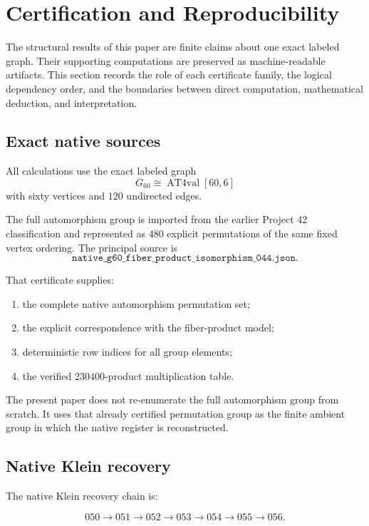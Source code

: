 \section{Certification and Reproducibility}

The structural results of this paper are finite claims about one exact
labeled graph. Their supporting computations are preserved as
machine-readable artifacts. This section records the role of each
certificate family, the logical dependency order, and the boundaries
between direct computation, mathematical deduction, and interpretation.

\subsection{Exact native sources}

All calculations use the exact labeled graph
\[
G_{60}\cong\operatorname{AT4val}[60,6]
\]
with sixty vertices and \(120\) undirected edges.

The full automorphism group is imported from the earlier Project 42
classification and represented as \(480\) explicit permutations of the
same fixed vertex ordering. The principal source is
\[
\texttt{native\_g60\_fiber\_product\_isomorphism\_044.json}.
\]

That certificate supplies:

\begin{enumerate}
    \item the complete native automorphism permutation set;
    \item the explicit correspondence with the fiber-product model;
    \item deterministic row indices for all group elements;
    \item the verified \(230400\)-product multiplication table.
\end{enumerate}

The present paper does not re-enumerate the full automorphism group
from scratch. It uses that already certified permutation group as the
finite ambient group in which the native register is reconstructed.

\subsection{Native Klein recovery}

The native Klein recovery chain is:

\[
050
\longrightarrow
051
\longrightarrow
052
\longrightarrow
053
\longrightarrow
054
\longrightarrow
055
\longrightarrow
056.
\]

